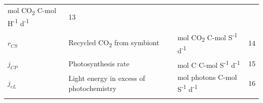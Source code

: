 \documentclass[]{elsarticle} %
\begin{document}
\begin{longtable}[]{@{}llll@{}}
\begin{minipage}[t]{0.26\columnwidth}
mol CO\textsubscript{2} C-mol H\textsuperscript{-1}
d\textsuperscript{-1}\strut
\end{minipage} & \begin{minipage}[t]{0.09\columnwidth}\raggedright\strut
13\strut
\end{minipage}\tabularnewline
\begin{minipage}[t]{0.09\columnwidth}\raggedright\strut
\(r_{CS}\)\strut
\end{minipage} & \begin{minipage}[t]{0.44\columnwidth}\raggedright\strut
Recycled CO\textsubscript{2} from symbiont\strut
\end{minipage} & \begin{minipage}[t]{0.26\columnwidth}\raggedright\strut
mol CO\textsubscript{2} C-mol S\textsuperscript{-1}
d\textsuperscript{-1}\strut
\end{minipage} & \begin{minipage}[t]{0.09\columnwidth}\raggedright\strut
14\strut
\end{minipage}\tabularnewline
\begin{minipage}[t]{0.09\columnwidth}\raggedright\strut
\(j_{CP}\)\strut
\end{minipage} & \begin{minipage}[t]{0.44\columnwidth}\raggedright\strut
Photosynthesis rate\strut
\end{minipage} & \begin{minipage}[t]{0.26\columnwidth}\raggedright\strut
mol C C-mol S\textsuperscript{-1} d\textsuperscript{-1}\strut
\end{minipage} & \begin{minipage}[t]{0.09\columnwidth}\raggedright\strut
15\strut
\end{minipage}\tabularnewline
\begin{minipage}[t]{0.09\columnwidth}\raggedright\strut
\(j_{eL}\)\strut
\end{minipage} & \begin{minipage}[t]{0.44\columnwidth}\raggedright\strut
Light energy in excess of photochemistry\strut
\end{minipage} & \begin{minipage}[t]{0.26\columnwidth}\raggedright\strut
mol photons C-mol S\textsuperscript{-1} d\textsuperscript{-1}\strut
\end{minipage} & \begin{minipage}[t]{0.09\columnwidth}\raggedright\strut
16\strut
\end{minipage}\tabularnewline
\begin{minipage}[t]{0.09\columnwidth}\raggedright\strut

\end{minipage}
\end{longtable}
\end{document}
